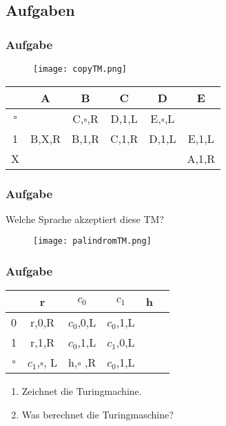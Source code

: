 \subsection{Aufgaben}
\begin{frame}[plain]
  \frametitle{Aufgabe}
  \begin{figure}
    \texttt{[image: copyTM.png]}
  \end{figure}
  \begin{center}
    \begin{tabular}{cccccc}
      \toprule
      & A       & B      & C       & D       & E \\
      \midrule
      $\square$&         & C,$\square$,R & D,1,L & E,$\square$,L  &  \\
      1         & B,X,R & B,1,R& C,1,R & D,1,L & E,1,L \\
      X         &         &        &         &         & A,1,R \\
      \bottomrule
    \end{tabular}
  \end{center}
\end{frame}
\begin{frame}[plain]
  \frametitle{Aufgabe}
  Welche Sprache akzeptiert diese TM?
  \begin{figure}
    \texttt{[image: palindromTM.png]}
  \end{figure}
\end{frame}
\begin{frame}
  \frametitle{Aufgabe}
  \begin{center}
    \begin{tabular}{cccccc}
      \toprule
      & r & $c_0$ & $c_1$ & h \\
      \midrule
      0 & r,0,R   & $c_0$,0,L & $c_0$,1,L \\
      1 & r,1,R   & $c_0$,1,L & $c_1$,0,L \\
      $\square$  & $c_1$,$\square$, L & h,$\square$ ,R   & $c_0$,1,L & \hphantom{C,1,L} \\
      \bottomrule
    \end{tabular}
  \end{center}
  \begin{enumerate}
    \item Zeichnet die Turingmachine.
    \item Was berechnet die Turingmaschine?\\
  \end{enumerate}
\end{frame}

